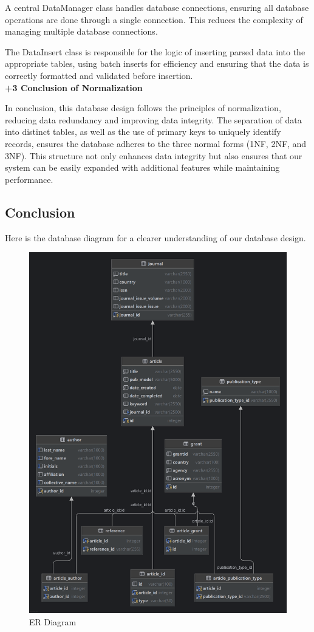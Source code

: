 \documentclass{article}
\begin{document}
A central DataManager class handles database connections, ensuring all database operations are done through a single connection. This reduces the complexity of managing multiple database connections.

The DataInsert class is responsible for the logic of inserting parsed data into the appropriate tables, using batch inserts for efficiency and ensuring that the data is correctly formatted and validated before insertion.
\vspace{6pt}
\\
\textbf{\uppercase\expandafter{\romannumeral+3} Conclusion of Normalization}

In conclusion, this database design follows the principles of normalization, reducing data redundancy and improving data integrity. The separation of data into distinct tables, as well as the use of primary keys to uniquely identify records, ensures the database adheres to the three normal forms (1NF, 2NF, and 3NF). This structure not only enhances data integrity but also ensures that our system can be easily expanded with additional features while maintaining performance.
\newpage
\subsection{Conclusion}
Here is the database diagram for a clearer understanding of our database design.

\begin{figure}[h]
\centering %
\includegraphics[width=.8\textwidth]{logic.png} %
\caption{ER Diagram} %
\label{fig:引用标签} %
\end{figure}
\end{document}
